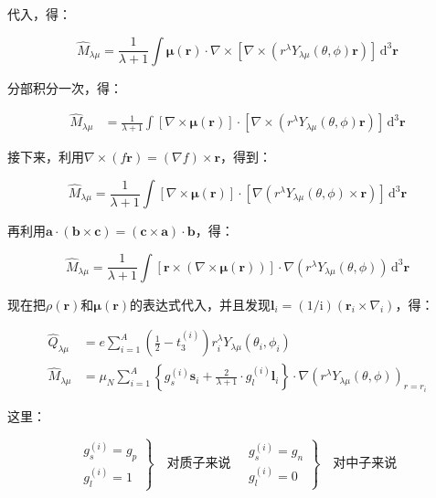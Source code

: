 \begin{booknote*}
代入，得：

\[
\hat{M}_{\lambda\mu}=\frac{1}{\lambda+1}\int\boldsymbol{\mu}(\boldsymbol{r})\cdot\nabla\times[\nabla\times(r^{\lambda}Y_{\lambda\mu}(\theta,\phi)\boldsymbol{r})]\,\mathrm{d}^{3}\boldsymbol{r}
\]

分部积分一次，得：

\begin{align*}
\hat{M}_{\lambda\mu} & =\frac{1}{\lambda+1}\int[\nabla\times\boldsymbol{\mu}(\boldsymbol{r})]\cdot[\nabla\times(r^{\lambda}Y_{\lambda\mu}(\theta,\phi)\boldsymbol{r})]\,\mathrm{d}^{3}\boldsymbol{r}
\end{align*}

接下来，利用$\nabla\times(f\boldsymbol{r})=(\nabla f)\times\boldsymbol{r}$，得到：

\[
\hat{M}_{\lambda\mu}=\frac{1}{\lambda+1}\int[\nabla\times\boldsymbol{\mu}(\boldsymbol{r})]\cdot[\nabla(r^{\lambda}Y_{\lambda\mu}(\theta,\phi)\times\boldsymbol{r})]\,\mathrm{d}^{3}\boldsymbol{r}
\]

再利用$\boldsymbol{a}\cdot(\boldsymbol{b}\times\boldsymbol{c})=(\boldsymbol{c}\times\boldsymbol{a})\cdot\boldsymbol{b}$，得：

\[
\hat{M}_{\lambda\mu}=\frac{1}{\lambda+1}\int[\boldsymbol{r}\times(\nabla\times\boldsymbol{\mu}(\boldsymbol{r}))]\cdot\nabla(r^{\lambda}Y_{\lambda\mu}(\theta,\phi))\,\mathrm{d}^{3}\boldsymbol{r}
\]
\end{booknote*}
现在把$\rho(\boldsymbol{r})$和$\boldsymbol{\mu}(\boldsymbol{r})$的表达式代入，并且发现$\boldsymbol{l}_{i}=(1/\mathrm{i})(\boldsymbol{r}_{i}\times\nabla_{i})$，得：

\begin{align}
\hat{Q}_{\lambda\mu} & =e\sum^{A}_{i=1}\left(\frac{1}{2}-t^{(i)}_{3}\right)r^{\lambda}_{i}Y_{\lambda\mu}(\theta_{i},\phi_{i})\label{eq:=009759=006001=007535=00591A=006781=007B97=007B26=005177=004F53}\\
\hat{M}_{\lambda\mu} & =\mu_{N}\sum^{A}_{i=1}\left\{ g^{(i)}_{s}\boldsymbol{s}_{i}+\frac{2}{\lambda+1}\cdot g^{(i)}_{l}\boldsymbol{l}_{i}\right\} \cdot\nabla(r^{\lambda}Y_{\lambda\mu}(\theta,\phi))_{r=r_{i}}\label{eq:=009759=006001=0078C1=00591A=006781=007B97=007B26=005177=004F53}
\end{align}

这里：

\[
\left.\begin{array}{c}
g^{(i)}_{s}=g_{p}\\
g^{(i)}_{l}=1
\end{array}\right\} \quad\text{对质子来说}\quad\left.\begin{array}{c}
g^{(i)}_{s}=g_{n}\\
g^{(i)}_{l}=0
\end{array}\right\} \quad\text{对中子来说}
\]

